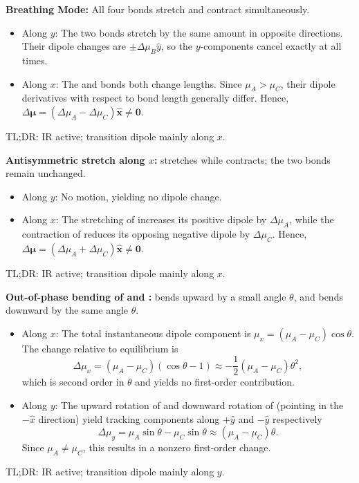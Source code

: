 \begin{solution}\leavevmode
  \begin{enumext}
    \item \textbf{Breathing Mode:}
    All four bonds stretch and contract simultaneously.
    \begin{itemize}
      \item Along $y$: The two  bonds stretch by the same amount in
      opposite directions. Their dipole changes are $\pm\Delta\mu_B \hat y$, 
      so the $y$‑components cancel exactly at all times.
      \item Along $x$: The  and  bonds both change lengths.
      Since $\mu_A > \mu_C$, their dipole derivatives with respect to bond
      length generally differ. Hence,
      $\Delta\bm \mu = (\Delta\mu_A - \Delta\mu_C) \hat {\bm x} \neq \bm 0$.
    \end{itemize}
    TL;DR: IR active; transition dipole mainly along $x$.

    \item \textbf{Antisymmetric stretch along $x$:}
     stretches while  contracts; the two  bonds remain
    unchanged.
    \begin{itemize}
      \item Along $y$: No motion, yielding no dipole change.
      \item Along $x$: The stretching of  increases its positive
      dipole by $\Delta\mu_A$, while the contraction of  reduces its
      opposing negative dipole by $\Delta\mu_C$. Hence,
      $\Delta\bm \mu = (\Delta\mu_A + \Delta\mu_C) \hat {\bm x} \neq \bm 0$.
    \end{itemize}
    TL;DR: IR active; transition dipole mainly along $x$.

    \item \textbf{Out-of-phase bending of  and :}
     bends upward by a small angle $\theta$, and  bends downward
    by the same angle $\theta$.
    \begin{itemize}
      \item Along $x$: The total instantaneous dipole component is 
      $\mu_x = (\mu_A - \mu_C)\cos\theta$. The change relative to
      equilibrium is
      \[
        \Delta\mu_x = (\mu_A - \mu_C)(\cos\theta - 1)
        \approx -\frac12 (\mu_A - \mu_C) \theta^2,
      \]
      which is second order in $\theta$ and yields no first‑order contribution.
      \item Along $y$: The upward rotation of  and downward rotation of
        (pointing in the $-\hat{x}$ direction) yield tracking
      components along $+\hat{y}$ and $-\hat{y}$ respectively
      \[
        \Delta \mu_y = \mu_A \sin\theta - \mu_C \sin\theta
        \approx (\mu_A - \mu_C) \theta.
      \]
      Since $\mu_A \neq \mu_C$, this results in a nonzero first‑order change.
    \end{itemize}
    TL;DR: IR active; transition dipole mainly along $y$.
  \end{enumext}
\end{solution}

